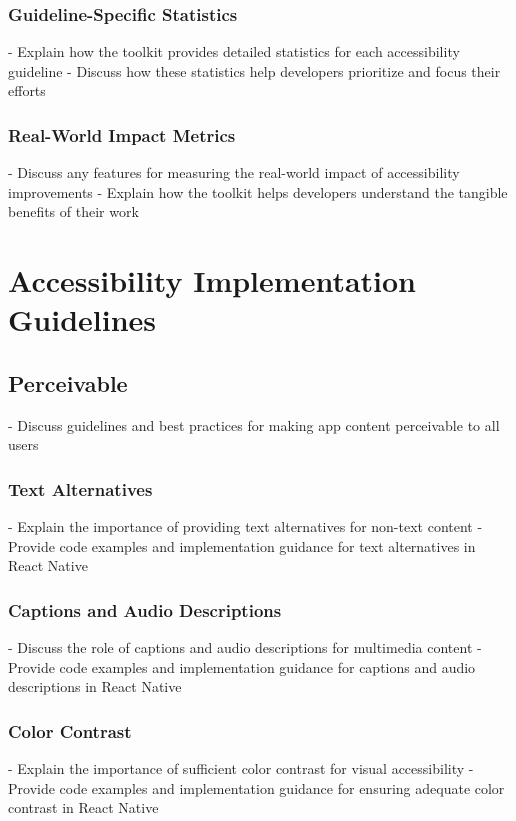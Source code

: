 \subsubsection{Guideline-Specific Statistics}
- Explain how the toolkit provides detailed statistics for each accessibility guideline
- Discuss how these statistics help developers prioritize and focus their efforts

\subsubsection{Real-World Impact Metrics}
- Discuss any features for measuring the real-world impact of accessibility improvements
- Explain how the toolkit helps developers understand the tangible benefits of their work

\section{Accessibility Implementation Guidelines}
\label{sec:implementation-guidelines}
\subsection{Perceivable}
- Discuss guidelines and best practices for making app content perceivable to all users

\subsubsection{Text Alternatives}
- Explain the importance of providing text alternatives for non-text content
- Provide code examples and implementation guidance for text alternatives in React Native

\subsubsection{Captions and Audio Descriptions}
- Discuss the role of captions and audio descriptions for multimedia content
- Provide code examples and implementation guidance for captions and audio descriptions in React Native

\subsubsection{Color Contrast}
- Explain the importance of sufficient color contrast for visual accessibility
- Provide code examples and implementation guidance for ensuring adequate color contrast in React Native

